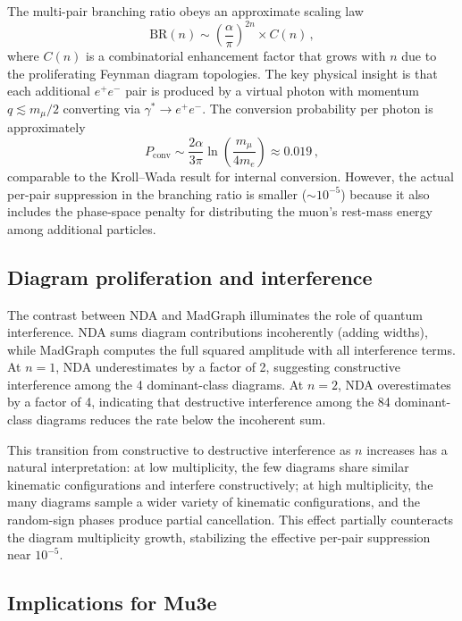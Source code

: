 \documentclass[11pt,a4paper]{article}
\begin{document}
The multi-pair branching ratio obeys an approximate scaling law
\begin{equation}
\text{BR}(n) \sim \left(\frac{\alpha}{\pi}\right)^{2n}
\times C(n)\,,
\label{eq:scaling}
\end{equation}
where $C(n)$ is a combinatorial enhancement factor that grows with $n$
due to the proliferating Feynman diagram topologies.
The key physical insight is that each additional $e^+e^-$ pair is
produced by a virtual photon with momentum $q \lesssim m_\mu/2$
converting via $\gamma^* \to e^+e^-$.
The conversion probability per photon is approximately
\begin{equation}
P_{\text{conv}} \sim \frac{2\alpha}{3\pi}
\ln\!\left(\frac{m_\mu}{4 m_e}\right)
\approx 0.019\,,
\end{equation}
comparable to the Kroll--Wada result for internal conversion.
However, the actual per-pair suppression in the branching ratio is
smaller ($\sim\!10^{-5}$) because it also includes the phase-space
penalty for distributing the muon's rest-mass energy among additional
particles.

\subsection{Diagram proliferation and interference}

The contrast between NDA and MadGraph illuminates the role of
quantum interference.
NDA sums diagram contributions incoherently (adding widths), while
MadGraph computes the full squared amplitude with all interference
terms.
At $n=1$, NDA underestimates by a factor of 2, suggesting
constructive interference among the 4 dominant-class diagrams.
At $n=2$, NDA overestimates by a factor of 4, indicating that
destructive interference among the 84 dominant-class diagrams
reduces the rate below the incoherent sum.

This transition from constructive to destructive interference as $n$
increases has a natural interpretation: at low multiplicity, the few
diagrams share similar kinematic configurations and interfere
constructively; at high multiplicity, the many diagrams sample a
wider variety of kinematic configurations, and the random-sign
phases produce partial cancellation.
This effect partially counteracts the diagram multiplicity growth,
stabilizing the effective per-pair suppression near $10^{-5}$.

\subsection{Implications for Mu3e}
\end{document}
